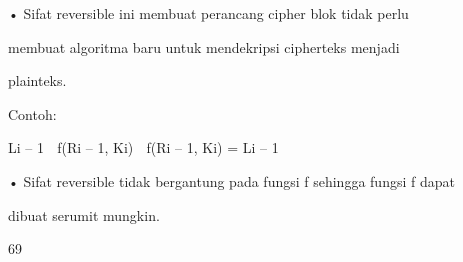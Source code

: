 \documentclass{article}
\begin{document}

• Sifat reversible ini membuat perancang cipher blok tidak perlu 

membuat algoritma baru untuk mendekripsi cipherteks menjadi 

plainteks. 

 Contoh: 

Li – 1  f(Ri – 1, Ki)  f(Ri – 1, Ki) = Li – 1 

• Sifat reversible tidak bergantung pada fungsi f sehingga fungsi f dapat 

dibuat serumit mungkin.

69
\end{document}
